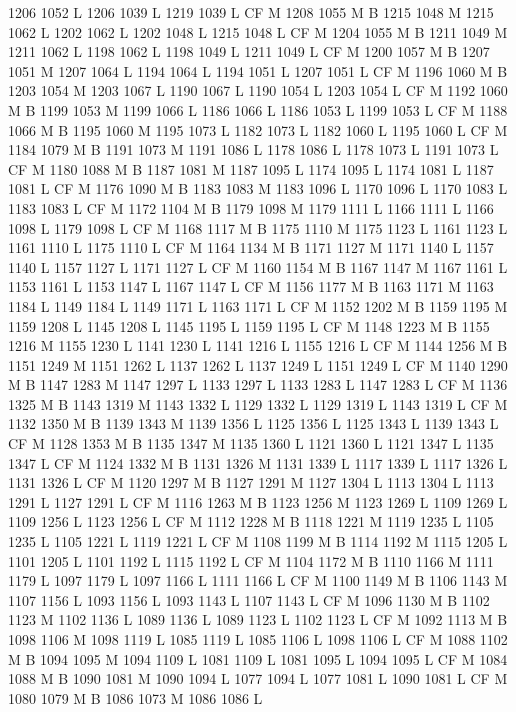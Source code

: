 {{{{{{{{{{{{{{{{{{{{{{{{{{{1206 1052 L
1206 1039 L
1219 1039 L
CF M
1208 1055 M B
1215 1048 M 1215 1062 L
1202 1062 L
1202 1048 L
1215 1048 L
CF M
1204 1055 M B
1211 1049 M 1211 1062 L
1198 1062 L
1198 1049 L
1211 1049 L
CF M
1200 1057 M B
1207 1051 M 1207 1064 L
1194 1064 L
1194 1051 L
1207 1051 L
CF M
1196 1060 M B
1203 1054 M 1203 1067 L
1190 1067 L
1190 1054 L
1203 1054 L
CF M
1192 1060 M B
1199 1053 M 1199 1066 L
1186 1066 L
1186 1053 L
1199 1053 L
CF M
1188 1066 M B
1195 1060 M 1195 1073 L
1182 1073 L
1182 1060 L
1195 1060 L
CF M
1184 1079 M B
1191 1073 M 1191 1086 L
1178 1086 L
1178 1073 L
1191 1073 L
CF M
1180 1088 M B
1187 1081 M 1187 1095 L
1174 1095 L
1174 1081 L
1187 1081 L
CF M
1176 1090 M B
1183 1083 M 1183 1096 L
1170 1096 L
1170 1083 L
1183 1083 L
CF M
1172 1104 M B
1179 1098 M 1179 1111 L
1166 1111 L
1166 1098 L
1179 1098 L
CF M
1168 1117 M B
1175 1110 M 1175 1123 L
1161 1123 L
1161 1110 L
1175 1110 L
CF M
1164 1134 M B
1171 1127 M 1171 1140 L
1157 1140 L
1157 1127 L
1171 1127 L
CF M
1160 1154 M B
1167 1147 M 1167 1161 L
1153 1161 L
1153 1147 L
1167 1147 L
CF M
1156 1177 M B
1163 1171 M 1163 1184 L
1149 1184 L
1149 1171 L
1163 1171 L
CF M
1152 1202 M B
1159 1195 M 1159 1208 L
1145 1208 L
1145 1195 L
1159 1195 L
CF M
1148 1223 M B
1155 1216 M 1155 1230 L
1141 1230 L
1141 1216 L
1155 1216 L
CF M
1144 1256 M B
1151 1249 M 1151 1262 L
1137 1262 L
1137 1249 L
1151 1249 L
CF M
1140 1290 M B
1147 1283 M 1147 1297 L
1133 1297 L
1133 1283 L
1147 1283 L
CF M
1136 1325 M B
1143 1319 M 1143 1332 L
1129 1332 L
1129 1319 L
1143 1319 L
CF M
1132 1350 M B
1139 1343 M 1139 1356 L
1125 1356 L
1125 1343 L
1139 1343 L
CF M
1128 1353 M B
1135 1347 M 1135 1360 L
1121 1360 L
1121 1347 L
1135 1347 L
CF M
1124 1332 M B
1131 1326 M 1131 1339 L
1117 1339 L
1117 1326 L
1131 1326 L
CF M
1120 1297 M B
1127 1291 M 1127 1304 L
1113 1304 L
1113 1291 L
1127 1291 L
CF M
1116 1263 M B
1123 1256 M 1123 1269 L
1109 1269 L
1109 1256 L
1123 1256 L
CF M
1112 1228 M B
1118 1221 M 1119 1235 L
1105 1235 L
1105 1221 L
1119 1221 L
CF M
1108 1199 M B
1114 1192 M 1115 1205 L
1101 1205 L
1101 1192 L
1115 1192 L
CF M
1104 1172 M B
1110 1166 M 1111 1179 L
1097 1179 L
1097 1166 L
1111 1166 L
CF M
1100 1149 M B
1106 1143 M 1107 1156 L
1093 1156 L
1093 1143 L
1107 1143 L
CF M
1096 1130 M B
1102 1123 M 1102 1136 L
1089 1136 L
1089 1123 L
1102 1123 L
CF M
1092 1113 M B
1098 1106 M 1098 1119 L
1085 1119 L
1085 1106 L
1098 1106 L
CF M
1088 1102 M B
1094 1095 M 1094 1109 L
1081 1109 L
1081 1095 L
1094 1095 L
CF M
1084 1088 M B
1090 1081 M 1090 1094 L
1077 1094 L
1077 1081 L
1090 1081 L
CF M
1080 1079 M B
1086 1073 M 1086 1086 L
}}}}}}}}}}}}}}}}}}}}}}}}}}}
